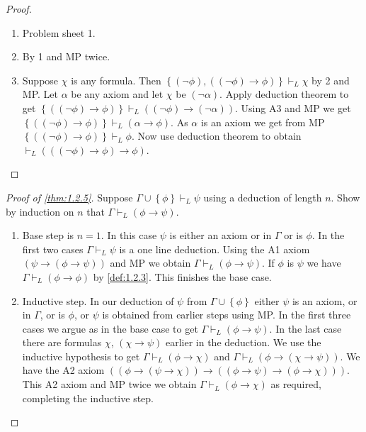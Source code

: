 \documentclass{article}
\newcommand{\rb}[1]{\left( #1 \right)}
\newcommand{\cb}[1]{\left\{ #1 \right\}}
\newcommand{\notb}[1]{\rb{\neg #1}}
\newcommand{\impb}[2]{\rb{#1 \rightarrow #2}}
\theoremstyle{definition}\newtheorem{definition}{Definition}[subsection]
\theoremstyle{definition}\newtheorem{remark}[definition]{Remark}
\theoremstyle{definition}\newtheorem*{example}{Example}
\theoremstyle{definition}\newtheorem*{note}{Note}
\begin{document}
\begin{proof}
\hfill
\begin{enumerate}
\item Problem sheet 1.
\item By 1 and MP twice.
\item Suppose $ \chi $ is any formula. Then $ \cb{\notb{\phi}, \impb{\notb{\phi}}{\phi}} \vdash_L \chi $ by 2 and MP. Let $ \alpha $ be any axiom and let $ \chi $ be $ \notb{\alpha} $. Apply deduction theorem to get $ \cb{\impb{\notb{\phi}}{\phi}} \vdash_L \impb{\notb{\phi}}{\notb{\alpha}} $. Using A3 and MP we get $ \cb{\impb{\notb{\phi}}{\phi}} \vdash_L \impb{\alpha}{\phi} $. As $ \alpha $ is an axiom we get from MP $ \cb{\impb{\notb{\phi}}{\phi}} \vdash_L \phi $. Now use deduction theorem to obtain $ \vdash_L \impb{\impb{\notb{\phi}}{\phi}}{\phi} $.
\end{enumerate}
\end{proof}

\begin{proof}[Proof of \ref{thm:1.2.5}]
Suppose $ \Gamma \cup \cb{\phi} \vdash_L \psi $ using a deduction of length $ n $. Show by induction on $ n $ that $ \Gamma \vdash_L \impb{\phi}{\psi} $.
\begin{enumerate}
\item Base step is $ n = 1 $. In this case $ \psi $ is either an axiom or in $ \Gamma $ or is $ \phi $. In the first two cases $ \Gamma \vdash_L \psi $ is a one line deduction. Using the A1 axiom $ \impb{\psi}{\impb{\phi}{\psi}} $ and MP we obtain $ \Gamma \vdash_L \impb{\phi}{\psi} $. If $ \phi $ is $ \psi $ we have $ \Gamma \vdash_L \impb{\phi}{\phi} $ by \ref{def:1.2.3}. This finishes the base case.
\item Inductive step. In our deduction of $ \psi $ from $ \Gamma \cup \cb{\phi} $ either $ \psi $ is an axiom, or in $ \Gamma $, or is $ \phi $, or $ \psi $ is obtained from earlier steps using MP. In the first three cases we argue as in the base case to get $ \Gamma \vdash_L \impb{\phi}{\psi} $. In the last case there are formulas $ \chi $, $ \impb{\chi}{\psi} $ earlier in the deduction. We use the inductive hypothesis to get $ \Gamma \vdash_L \impb{\phi}{\chi} $ and $ \Gamma \vdash_L \impb{\phi}{\impb{\chi}{\psi}} $. We have the A2 axiom $ \impb{\impb{\phi}{\impb{\psi}{\chi}}}{\impb{\impb{\phi}{\psi}}{\impb{\phi}{\chi}}} $. This A2 axiom and MP twice we obtain $ \Gamma \vdash_L \impb{\phi}{\chi} $ as required, completing the inductive step.
\end{enumerate}
\end{proof}
\end{document}
